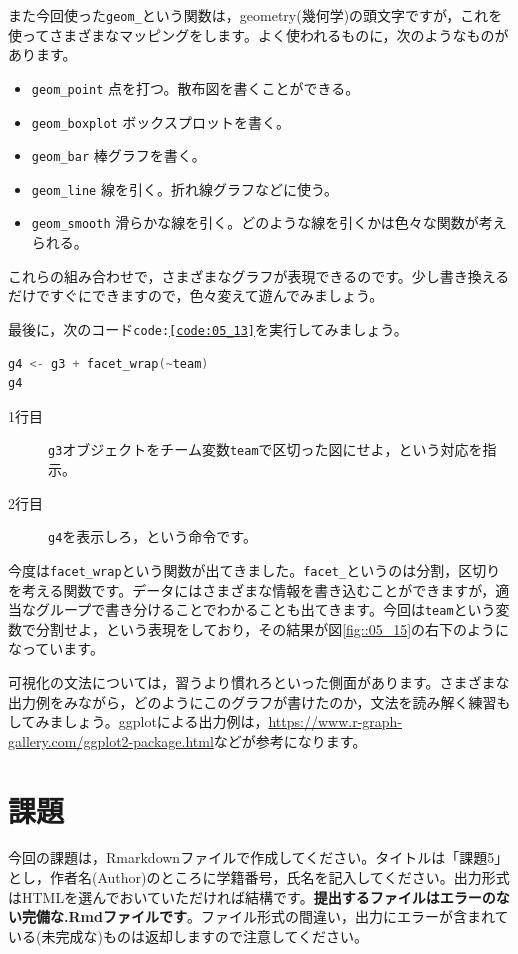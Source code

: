 \documentclass{ltjsbook}
\begin{document}
また今回使った\verb|geom_|という関数は，geometry(幾何学)の頭文字ですが，これを使ってさまざまなマッピングをします。よく使われるものに，次のようなものがあります。
\begin{itemize}
	\item \verb|geom_point| 点を打つ。散布図を書くことができる。
	\item \verb|geom_boxplot| ボックスプロットを書く。
	\item \verb|geom_bar| 棒グラフを書く。
	\item \verb|geom_line| 線を引く。折れ線グラフなどに使う。
	\item \verb|geom_smooth| 滑らかな線を引く。どのような線を引くかは色々な関数が考えられる。
\end{itemize}
これらの組み合わせで，さまざまなグラフが表現できるのです。少し書き換えるだけですぐにできますので，色々変えて遊んでみましょう。

最後に，次のコード\texttt{code:\ref{code:05_13}}を実行してみましょう。
\begin{lstlisting}[language=c++,label={code:05_13},caption={チームごとに分割}]
g4 <- g3 + facet_wrap(~team)
g4
\end{lstlisting}

\begin{description}
	\item[1行目] \texttt{g3}オブジェクトをチーム変数\verb|team|で区切った図にせよ，という対応を指示。
	\item[2行目] \texttt{g4}を表示しろ，という命令です。
\end{description}

今度は\verb|facet_wrap|という関数が出てきました。\verb|facet_|というのは分割，区切りを考える関数です。データにはさまざまな情報を書き込むことができますが，適当なグループで書き分けることでわかることも出てきます。今回は\verb|team|という変数で分割せよ，という表現をしており，その結果が図\ref{fig::05_15}の右下のようになっています。

可視化の文法については，習うより慣れろといった側面があります。さまざまな出力例をみながら，どのようにこのグラフが書けたのか，文法を読み解く練習もしてみましょう。ggplotによる出力例は，\url{https://www.r-graph-gallery.com/ggplot2-package.html}などが参考になります。

\section{課題}
今回の課題は，Rmarkdownファイルで作成してください。タイトルは「課題5」とし，作者名(Author)のところに学籍番号，氏名を記入してください。出力形式はHTMLを選んでおいていただければ結構です。\textbf{提出するファイルはエラーのない完備な.Rmdファイルです}。ファイル形式の間違い，出力にエラーが含まれている(未完成な)ものは返却しますので注意してください。
\end{document}
